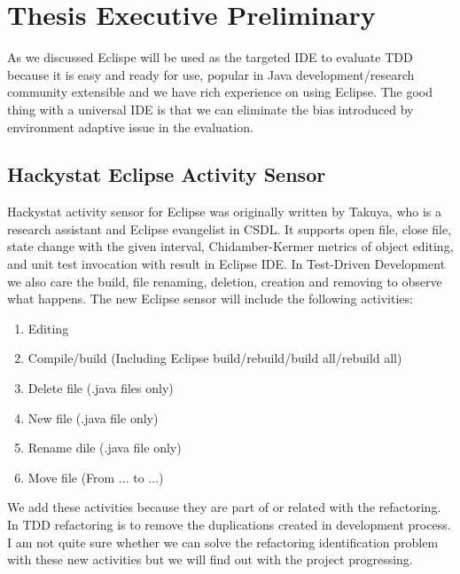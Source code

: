 
\chapter{Thesis Executive Preliminary}
As we discussed Eclispe will be used as the targeted IDE to evaluate TDD
because it is easy and ready for use, popular in Java development/research
community extensible and we have rich experience on using Eclipse. The good
thing with a universal IDE is that we can eliminate the bias introduced by
environment adaptive issue in the evaluation.

\section{Hackystat Eclipse Activity Sensor}
Hackystat activity sensor for Eclipse was originally written by Takuya, who
is a research assistant and Eclipse evangelist in CSDL. It supports open
file, close file, state change with the given interval, Chidamber-Kermer
metrics of object editing, and unit test invocation with result in Eclipse
IDE. In Test-Driven Development we also care the build, file renaming,
deletion, creation and removing to observe what happens. The new Eclipse
sensor will include the following activities:
\begin{enumerate}
\item Editing
\item Compile/build (Including Eclipse build/rebuild/build all/rebuild all)
\item Delete file   (.java files only)
\item New file      (.java file only)
\item Rename dile   (.java file only)
\item Move file     (From ... to ...)
\end{enumerate}

We add these activities because they are part of or related with the
refactoring. In TDD refactoring is to remove the duplications created in
development process. I am not quite sure whether we can solve the
refactoring identification problem with these new activities but we will
find out with the project progressing.

